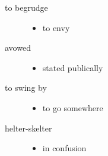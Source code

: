 \documentclass[a4paper]{article}
\begin{document}
\begin{description}
\begin{itemize}
    \end{itemize}
    \item[to begrudge] \begin{itemize}
        \item to envy
    \end{itemize}
    \item[avowed] \begin{itemize}
        \item stated publically
    \end{itemize}
    \item[to swing by] \begin{itemize}
        \item to go somewhere
    \end{itemize}
    \item[helter-skelter] \begin{itemize}
        \item in confusion
    \end{itemize}
\end{description}
\end{document}
